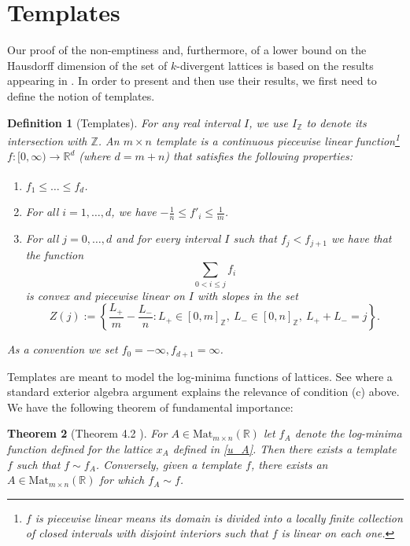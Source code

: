 \documentclass[reqno,11pt]{amsart}
\theoremstyle{plain}
\newtheorem{thm}{Theorem}[section]
\newtheorem{defn}[thm]{Definition}
\theoremstyle{definition}
\theoremstyle{remark}
\numberwithin{equation}{section}
\newcommand{\R}{{\mathbb{R}}}
\newcommand{\Z}{{\mathbb{Z}}}
\begin{document}
\section{Templates}
Our proof of the non-emptiness and, furthermore, of a lower bound on the Hausdorff dimension of the set of $k$-divergent lattices is based on the results appearing in \cite{DFSU}. In order to present and then use their results, we first need to define the notion of templates.

\begin{defn}[Templates]\label{Templates}
For any real interval $I$, we use $I_\Z$ to denote its intersection with $\Z$. 
An $m \times n$ template is a continuous piecewise linear function\footnote{$f$ is piecewise linear means its domain is divided into a locally finite collection of closed intervals with disjoint interiors such that $f$ is linear on each one.} $f: [0,\infty) \xrightarrow[]{} \R^d$ (where $d=m+n$) that satisfies the following properties:
\begin{enumerate}
    \item[(a)] $f_1 \leq \dots \leq f_d$.
    \item[(b)] For all $i = 1,\dots,d$, we have $-\frac{1}{n} \leq f'_i \leq \frac{1}{m}$.
    \item[(c)] For all $j=0,\dots,d$ and for every interval $I$ such that $f_j<f_{j+1}$ we have that the function 
    \begin{equation*}\sum_{0<i \leq j} f_i
    \end{equation*}
    is convex and piecewise linear on $I$ with slopes in the set
    \begin{equation*}
        Z(j) := \left\lbrace \frac{L_+}{m} - \frac{L_-}{n}: L_+ \in [0,m]_{\Z},\ L_- \in [0,n]_\Z,\  L_+ + L_- = j \right\rbrace.
    \end{equation*} 
\end{enumerate}
As a convention we set $f_0=-\infty,f_{d+1}=\infty$.
\end{defn}
Templates are meant to model the log-minima functions of lattices. See \cite[Lemma 32.7]{DFSU} where a standard exterior algebra argument explains the relevance of condition (c) above.
We have the following theorem of fundamental importance:
\begin{thm}[Theorem 4.2 \cite{DFSU}]\label{template-lattice}
For $A \in \text{Mat}_{m\times n}(\R)$ let $f_A$ denote the log-minima function defined for the lattice $x_A$ defined in \eqref{u_A}.
Then there exists a template $f$ such that $f \sim f_A$.
Conversely, given a template $f$, there exists an $A \in \text{Mat}_{m\times n}(\R)$ for which $f_A \sim f$.
\end{thm}
\end{document}
